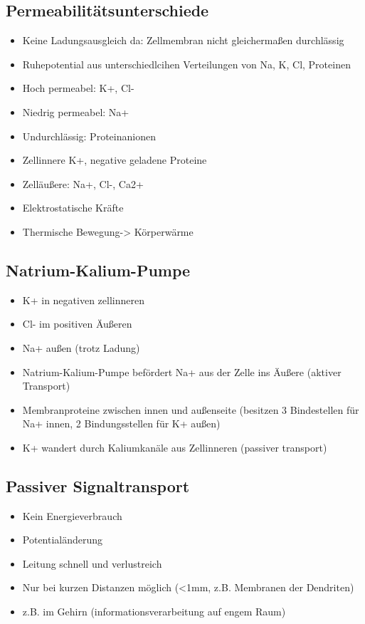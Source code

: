 \documentclass[a4paper,10pt,oneside]{article}
\begin{document}
\subsection{Permeabilitätsunterschiede}
\begin{itemize}
	\item Keine Ladungsausgleich da: Zellmembran nicht gleichermaßen durchlässig
	\item Ruhepotential aus unterschiedlcihen Verteilungen von Na, K, Cl, Proteinen
	\item Hoch permeabel: K+, Cl-
	\item Niedrig permeabel: Na+
	\item Undurchlässig: Proteinanionen
	\item Zellinnere K+, negative geladene Proteine
	\item Zelläußere: Na+, Cl-, Ca2+
	\item Elektrostatische Kräfte
	\item Thermische Bewegung-> Körperwärme
\end{itemize}

\subsection{Natrium-Kalium-Pumpe}
\begin{itemize}
	\item K+ in negativen zellinneren
	\item Cl- im positiven Äußeren
	\item Na+ außen (trotz Ladung)
	\item Natrium-Kalium-Pumpe befördert Na+ aus der Zelle ins Äußere (aktiver Transport)
	\item Membranproteine zwischen innen und außenseite (besitzen 3 Bindestellen für Na+ innen, 2 Bindungsstellen für K+ außen)
	\item K+ wandert durch Kaliumkanäle aus Zellinneren (passiver transport)
\end{itemize}

\subsection{Passiver Signaltransport}
\begin{itemize}
	\item Kein Energieverbrauch
	\item Potentialänderung
	\item Leitung schnell und verlustreich
	\item Nur bei kurzen Distanzen möglich (<1mm, z.B. Membranen der Dendriten)
	\item z.B. im Gehirn (informationsverarbeitung auf engem Raum)
\end{itemize}
\end{document}
